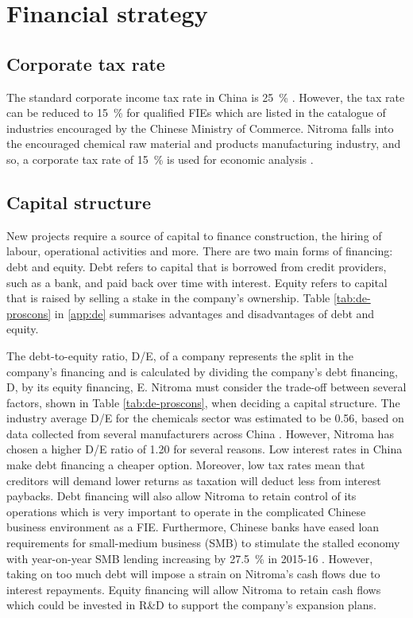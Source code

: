 \section{Financial strategy}
\subsection{Corporate tax rate}
\label{sec:tax}
The standard corporate income tax rate in China is \SI{25}{\percent} \cite{pwc_peoples_2021}. However, the tax rate can be reduced to \SI{15}{\percent} for qualified FIEs which are listed in the catalogue of industries encouraged by the Chinese Ministry of Commerce. Nitroma falls into the encouraged chemical raw material and products manufacturing industry, and so, a corporate tax rate of \SI{15}{\percent} is used for economic analysis \cite{ministry_of_commerce_china_catalouge_2020}.

\subsection{Capital structure}
\label{sec:de-ratio}
New projects require a source of capital to finance construction, the hiring of labour, operational activities and more. There are two main forms of financing: debt and equity. Debt refers to capital that is borrowed from credit providers, such as a bank, and paid back over time with interest. Equity refers to capital that is raised by selling a stake in the company’s ownership. Table \ref{tab:de-proscons} in \cref{app:de} summarises advantages and disadvantages of debt and equity.

The debt-to-equity ratio, D/E, of a company represents the split in the company’s financing and is calculated by dividing the company’s debt financing, D, by its equity financing, E. Nitroma must consider the trade-off between several factors, shown in Table \ref{tab:de-proscons}, when deciding a capital structure. The industry average D/E for the chemicals sector was estimated to be 0.56, based on data collected from several manufacturers across China \cite{yahoofinance_stock_2021}. However, Nitroma has chosen a higher D/E ratio of 1.20 for several reasons. Low interest rates in China make debt financing a cheaper option. Moreover, low tax rates mean that creditors will demand lower returns as taxation will deduct less from interest paybacks. Debt financing will also allow Nitroma to retain control of its operations which is very important to operate in the complicated Chinese business environment as a FIE. Furthermore, Chinese banks have eased loan requirements for small-medium business (SMB) to stimulate the stalled economy with year-on-year SMB lending increasing by \SI{27.5}{\percent} in 2015-16 \cite{reuters_staff_chinas_2020}. However, taking on too much debt will impose a strain on Nitroma’s cash flows due to interest repayments. Equity financing will allow Nitroma to retain cash flows which could be invested in R\&D to support the company’s expansion plans.

